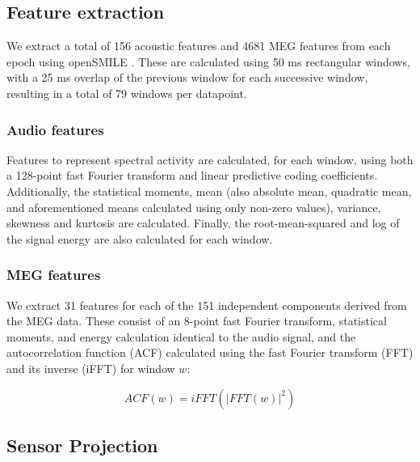 \documentclass[utf8]{frontiersSCNS} %
\begin{document}
\subsection{Feature extraction}

We extract a total of 156 acoustic features and 4681 MEG features from each epoch using openSMILE \cite{Eyben13-RDI}. These are calculated using 50 ms rectangular windows, with a 25 ms overlap of the previous window for each successive window, resulting in a total of 79 windows per datapoint.

\subsubsection{Audio features}

Features to represent spectral activity are calculated, for each window, using both a 128-point fast Fourier transform and linear predictive coding coefficients. Additionally, the statistical moments, mean (also absolute mean, quadratic mean, and aforementioned means calculated using only non-zero values), variance, skewness and kurtosis are calculated. Finally, the root-mean-squared and log of the signal energy are also calculated for each window.

\subsubsection{MEG features}

We extract 31 features for each of the 151 independent components derived from the MEG data. These consist of an 8-point fast Fourier transform, statistical moments, and energy calculation identical to the audio signal, and the autocorrelation function (ACF) calculated using the fast Fourier transform (FFT) and its inverse (iFFT) for window $w$:


\begin{equation}
  ACF(w) = iFFT(|FFT(w)|^2)
  \label{eq1}
\end{equation}

\subsection{Sensor Projection}
\end{document}
